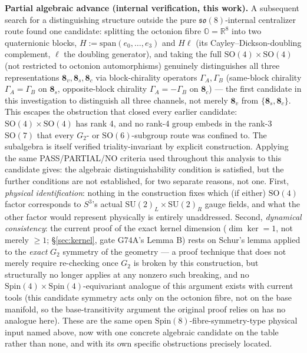\documentclass[12pt,a4paper]{article}
\begin{document}
\begin{enumerate}
  \textbf{Partial algebraic advance (internal verification, this work).} A subsequent
  search for a distinguishing structure outside the pure $\mathfrak{so}(8)$-internal
  centralizer route found one candidate: splitting the octonion fibre
  $\mathbb{O}=\mathbb{R}^8$ into two quaternionic blocks, $H:=\mathrm{span}(e_0,\dots,e_3)$
  and $H\ell$ (its Cayley--Dickson-doubling complement, $\ell$ the doubling generator),
  and taking the full $\mathrm{SO}(4)\times\mathrm{SO}(4)$ (not restricted to octonion
  automorphisms) genuinely distinguishes all three representations
  $\mathbf{8}_v,\mathbf{8}_s,\mathbf{8}_c$
  via block-chirality operators $\Gamma_A,\Gamma_B$ (same-block chirality $\Gamma_A=\Gamma_B$
  on $\mathbf{8}_s$, opposite-block chirality $\Gamma_A=-\Gamma_B$ on $\mathbf{8}_c$) --- the
  first candidate in this investigation to distinguish all three channels, not merely
  $\mathbf{8}_v$ from $\{\mathbf{8}_s,\mathbf{8}_c\}$. This escapes the obstruction that
  closed every earlier candidate: $\mathrm{SO}(4)\times\mathrm{SO}(4)$ has rank 4, and no
  rank-4 group embeds in the rank-3 $\mathrm{SO}(7)$ that every $G_2$- or
  $\mathrm{SO}(6)$-subgroup route was confined to. The subalgebra is itself verified
  triality-invariant by explicit construction. Applying the same PASS/PARTIAL/NO
  criteria used throughout this analysis to this candidate gives: the algebraic
  distinguishability condition is satisfied, but the further conditions are not
  established, for two separate reasons, not one. First, \emph{physical identification}:
  nothing in the construction fixes which (if either) $\mathrm{SO}(4)$ factor
  corresponds to $S^3$'s actual $\mathrm{SU}(2)_L\times\mathrm{SU}(2)_R$ gauge fields,
  and what the other factor would represent physically is entirely unaddressed. Second,
  \emph{dynamical consistency}: the current proof of the exact kernel dimension
  ($\dim\ker=1$, not merely $\geq 1$; \S\ref{sec:kernel}, gate G74A's Lemma B) rests on
  Schur's lemma applied to the \emph{exact} $G_2$ symmetry of the geometry --- a proof
  technique that does not merely require re-checking once $G_2$ is broken by this
  construction, but structurally no longer applies at any nonzero such breaking, and no
  $\mathrm{Spin}(4)\times\mathrm{Spin}(4)$-equivariant analogue of this argument exists
  with current tools (this candidate symmetry acts only on the octonion fibre, not on
  the base manifold, so the base-transitivity argument the original proof relies on has
  no analogue here). These are the same open $\mathrm{Spin}(8)$-fibre-symmetry-type
  physical input named above, now with one concrete algebraic candidate on the table
  rather than none, and with its own specific obstructions precisely located.


\end{enumerate}
\end{document}

